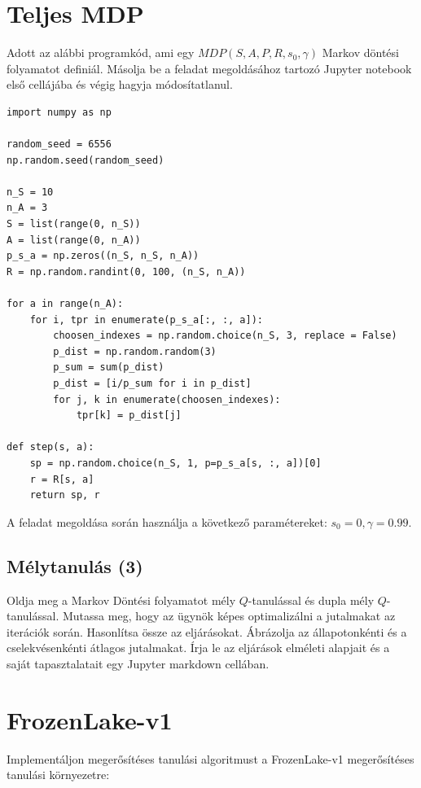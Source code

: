 \documentclass[english]{article}
\begin{document}
\newpage

\section{Teljes MDP}

Adott az alábbi programkód, ami egy $MDP(S,A,P,R,s_0,\gamma)$ Markov döntési folyamatot definiál. Másolja be a feladat megoldásához tartozó Jupyter notebook első cellájába és végig hagyja módosítatlanul.

\begin{lstlisting}[style=mystyle]
import numpy as np

random_seed = 6556
np.random.seed(random_seed)

n_S = 10
n_A = 3
S = list(range(0, n_S))
A = list(range(0, n_A))
p_s_a = np.zeros((n_S, n_S, n_A))
R = np.random.randint(0, 100, (n_S, n_A))

for a in range(n_A):
    for i, tpr in enumerate(p_s_a[:, :, a]):
        choosen_indexes = np.random.choice(n_S, 3, replace = False)
        p_dist = np.random.random(3)    
        p_sum = sum(p_dist)
        p_dist = [i/p_sum for i in p_dist]
        for j, k in enumerate(choosen_indexes):
            tpr[k] = p_dist[j]

def step(s, a):   
    sp = np.random.choice(n_S, 1, p=p_s_a[s, :, a])[0]
    r = R[s, a]    
    return sp, r
\end{lstlisting}
A feladat megoldása során használja a következő paramétereket: $s_0=0, \gamma=0.99$.

\subsection{Mélytanulás (3)}

Oldja meg a Markov Döntési folyamatot mély $Q$-tanulással és dupla mély $Q$-tanulással. Mutassa meg, hogy az ügynök képes optimalizálni a jutalmakat az iterációk során. Hasonlítsa össze az eljárásokat. Ábrázolja az állapotonkénti és a cselekvésenkénti átlagos jutalmakat. Írja le az eljárások elméleti alapjait és a saját tapasztalatait egy Jupyter markdown cellában. 

\newpage

\section{FrozenLake-v1}

Implementáljon megerősítéses tanulási algoritmust a FrozenLake-v1 megerősítéses tanulási környezetre:
\end{document}
